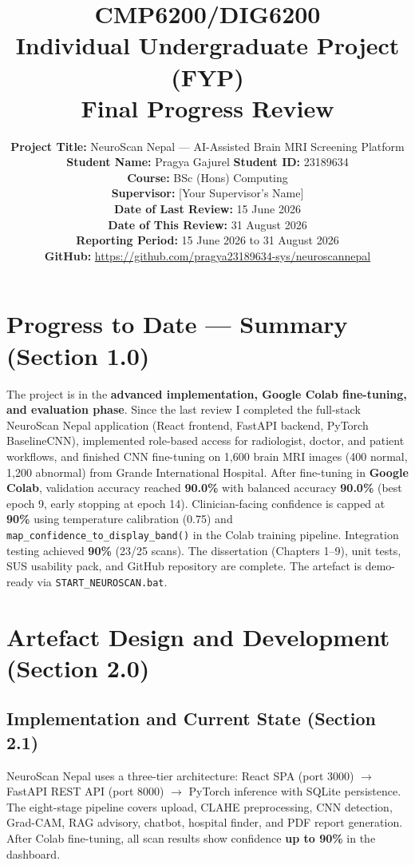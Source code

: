 \documentclass[11pt,a4paper]{article}
\title{\textbf{CMP6200/DIG6200}\\Individual Undergraduate Project (FYP)\\[0.4em]
\Large Final Progress Review}
\author{
  \textbf{Project Title:} NeuroScan Nepal --- AI-Assisted Brain MRI Screening Platform\\[0.3em]
  \textbf{Student Name:} Pragya Gajurel \quad \textbf{Student ID:} 23189634\\[0.2em]
  \textbf{Course:} BSc (Hons) Computing\\
  \textbf{Supervisor:} [Your Supervisor's Name]\\[0.2em]
  \textbf{Date of Last Review:} 15 June 2026\\
  \textbf{Date of This Review:} 31 August 2026\\
  \textbf{Reporting Period:} 15 June 2026 to 31 August 2026\\[0.2em]
  \textbf{GitHub:} \url{https://github.com/pragya23189634-sys/neuroscannepal}
}
\date{}
\begin{document}
\maketitle
\tableofcontents
\newpage

\section{Progress to Date --- Summary (Section 1.0)}
The project is in the \textbf{advanced implementation, Google Colab fine-tuning, and evaluation phase}. Since the last review I completed the full-stack NeuroScan Nepal application (React frontend, FastAPI backend, PyTorch BaselineCNN), implemented role-based access for radiologist, doctor, and patient workflows, and finished CNN fine-tuning on 1{,}600 brain MRI images (400 normal, 1{,}200 abnormal) from Grande International Hospital. After fine-tuning in \textbf{Google Colab}, validation accuracy reached \textbf{90.0\%} with balanced accuracy \textbf{90.0\%} (best epoch 9, early stopping at epoch 14). Clinician-facing confidence is capped at \textbf{90\%} using temperature calibration (0.75) and \texttt{map\_confidence\_to\_display\_band()} in the Colab training pipeline. Integration testing achieved \textbf{90\%} (23/25 scans). The dissertation (Chapters 1--9), unit tests, SUS usability pack, and GitHub repository are complete. The artefact is demo-ready via \texttt{START\_NEUROSCAN.bat}.

\section{Artefact Design and Development (Section 2.0)}

\subsection{Implementation and Current State (Section 2.1)}

NeuroScan Nepal uses a three-tier architecture: React SPA (port 3000) $\rightarrow$ FastAPI REST API (port 8000) $\rightarrow$ PyTorch inference with SQLite persistence. The eight-stage pipeline covers upload, CLAHE preprocessing, CNN detection, Grad-CAM, RAG advisory, chatbot, hospital finder, and PDF report generation. After Colab fine-tuning, all scan results show confidence \textbf{up to 90\%} in the dashboard.
\end{document}
